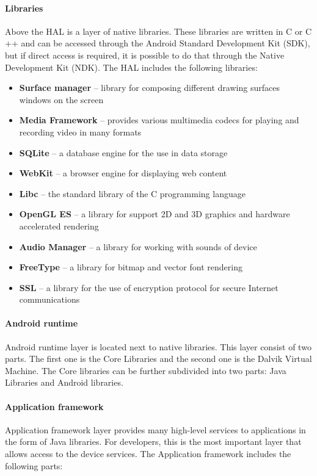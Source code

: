 \paragraph{Libraries}
Above the HAL is a layer of native libraries. These libraries are written in C or C ++ and can be accessed through the Android Standard Development Kit (SDK), but if direct access is required, it is possible to do that through the Native Development Kit (NDK). The HAL includes the following libraries:

\begin{itemize}
\item \textbf{Surface manager} -- library for composing different drawing surfaces windows on the screen
\item \textbf{Media Framework} -- provides various multimedia codecs for playing and recording video in many formats
\item \textbf{SQLite} -- a database engine for the use in data storage
\item \textbf{WebKit} -- a browser engine for displaying web content
\item \textbf{Libc} -- the standard library of the C programming language
\item \textbf{OpenGL ES} -- a library for support 2D and 3D graphics and hardware accelerated rendering
\item \textbf{Audio Manager} -- a library for working with sounds of device
\item \textbf{FreeType} -- a library for bitmap and vector font rendering
\item \textbf{SSL} -- a library for the use of encryption protocol for secure Internet communications
\end{itemize}

\paragraph{Android runtime}
Android runtime layer is located next to native libraries. This layer consist of two parts. The first one is the Core Libraries and the second one is the Dalvik Virtual Machine. The Core libraries can be further subdivided into two parts: Java Libraries and Android libraries.

\paragraph{Application framework}
Application framework layer provides many high-level services to applications in the form of Java libraries. For developers, this is the most important layer that allows access to the device services. The Application framework includes the following parts:
 
